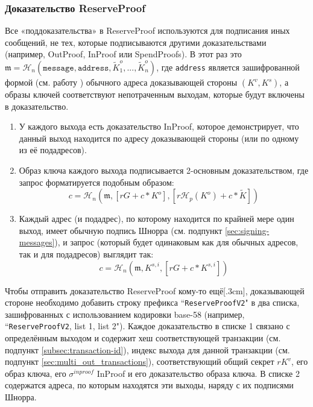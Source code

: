 \subsubsection*{Доказательство ReserveProof}%

Все «поддоказательства» в ReserveProof используются для подписания иных сообщений, не тех, которые подписываются другими доказательствами (например, OutProof, InProof или SpendProofs). В этот раз это $\mathfrak{m} = \mathcal{H}_n(\texttt{message}, \texttt{address}, \tilde{K}^o_1, ..., \tilde{K}^o_n)$, где {\tt address} является зашифрованной формой (см. работу \cite{luigi-address}) обычного адреса доказывающей стороны $(K^v, K^s)$, а образы ключей соответствуют непотраченным выходам, которые будут включены в доказа\-тельство.

\begin{enumerate}
    \item У каждого выхода есть доказательство InProof, которое демонстрирует, что данный выход находится по адресу доказывающей стороны (или по одному из её подадресов).
    \item Образ ключа каждого выхода подписывается 2-основным доказательством, где запрос форматируется подобным образом:%
    \[c = \mathcal{H}_n(\mathfrak{m}, [r G + c*K^o], [r \mathcal{H}_p(K^o) + c*\tilde{K}])\]
    \item Каждый адрес (и подадрес), по которому находится по крайней мере один выход, имеет обычную подпись Шнорра (см. подпункт \ref{sec:signing-messages}), и запрос (который будет одинаковым как для обычных адресов, так и для подадресов) выглядит так:
    \[c = \mathcal{H}_n(\mathfrak{m}, K^{s,i}, [r G + c*K^{s,i}])\]
\end{enumerate}{}

Чтобы отправить доказательство ReserveProof кому-то ещё[.3cm], доказывающей стороне необходи\-мо добавить строку префикса ``{\tt ReserveProofV2}" в два списка, зашифрованных с использова\-нием кодировки base-58 (например, ``{\tt ReserveProofV2}, list 1, list 2"). Каждое доказательство в списке 1 связано с определённым выходом и содержит хеш соответствующей транзакции (см. подпункт \ref{subsec:transaction-id}), индекс выхода для данной транзакции (см. подпункт \ref{sec:multi_out_transactions}), соответствующий общий секрет $r K^v$, его образ ключа, его $\sigma^{inproof}$ InProof и его доказательство образа ключа. В списке 2 содержатся адреса, по которым находятся эти выходы, наряду с их подписями Шнорра.


